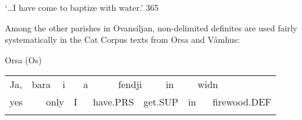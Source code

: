 \begin{styleTranslation}
‘…I have come to baptize with water.’ 365

\end{styleTranslation}

\begin{styleBodytextC}
Among the other parishes in Ovansiljan, non-delimited definites are used fairly systematically in the Cat Corpus texts from Orsa and Våmhus: 

\end{styleBodytextC}


\begin{listWWNumileveli}
\item {}

\end{listWWNumileveli}

\begin{listWWNumxxixleveli}
\item {}

\begin{styleExLtrTbl}
Orsa (Os)

\end{styleExLtrTbl}

\end{listWWNumxxixleveli}

\begin{tabular}{llllllllllllll}
\lsptoprule
Ja, & \multicolumn{2}{l}{bara

} & \multicolumn{2}{l}{i

} & \multicolumn{2}{l}{a

} & \multicolumn{2}{l}{fendji

} & \multicolumn{2}{l}{in

} & \multicolumn{2}{l}{widn

} & \\
\multicolumn{2}{l}{yes

} & \multicolumn{2}{l}{only

} & \multicolumn{2}{l}{I

} & \multicolumn{2}{l}{have.PRS

} & \multicolumn{2}{l}{get.SUP

} & \multicolumn{2}{l}{in

} & \multicolumn{2}{l}{firewood.DEF

}\\
\lspbottomrule
\end{tabular}

